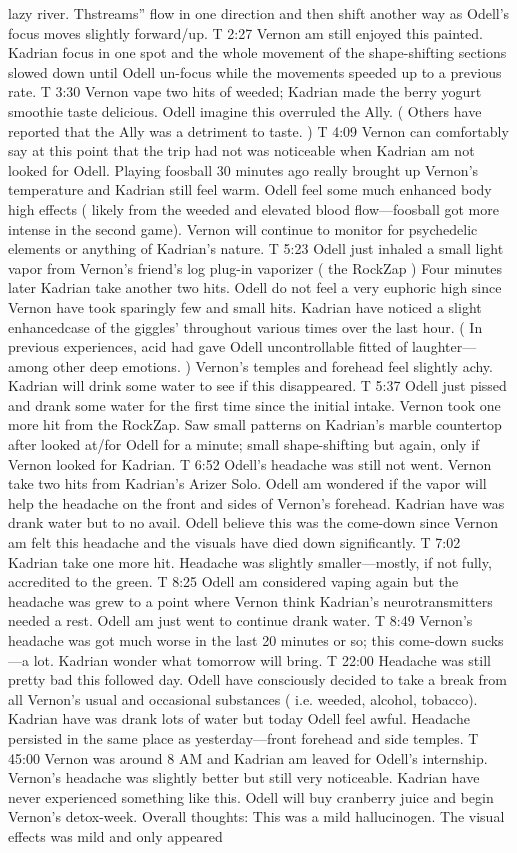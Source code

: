 \documentclass[12pt]{book}
\begin{document}
lazy river. Thstreams'' flow in one direction and then shift another way as Odell's focus moves slightly forward/up. T 2:27 Vernon am still enjoyed this painted. Kadrian focus in one spot and the whole movement of the shape-shifting sections slowed down until Odell un-focus while the movements speeded up to a previous rate. T 3:30 Vernon vape two hits of weeded; Kadrian made the berry yogurt smoothie taste delicious. Odell imagine this overruled the Ally. ( Others have reported that the Ally was a detriment to taste. ) T 4:09 Vernon can comfortably say at this point that the trip had not was noticeable when Kadrian am not looked for Odell. Playing foosball 30 minutes ago really brought up Vernon's temperature and Kadrian still feel warm. Odell feel some much enhanced body high effects ( likely from the weeded and elevated blood flow---foosball got more intense in the second game). Vernon will continue to monitor for psychedelic elements or anything of Kadrian's nature. T 5:23 Odell just inhaled a small light vapor from Vernon's friend's log plug-in vaporizer ( the RockZap ) Four minutes later Kadrian take another two hits. Odell do not feel a very euphoric high since Vernon have took sparingly few and small hits. Kadrian have noticed a slight enhancedcase of the giggles' throughout various times over the last hour. ( In previous experiences, acid had gave Odell uncontrollable fitted of laughter---among other deep emotions. ) Vernon's temples and forehead feel slightly achy. Kadrian will drink some water to see if this disappeared. T 5:37 Odell just pissed and drank some water for the first time since the initial intake. Vernon took one more hit from the RockZap. Saw small patterns on Kadrian's marble countertop after looked at/for Odell for a minute; small shape-shifting but again, only if Vernon looked for Kadrian. T 6:52 Odell's headache was still not went. Vernon take two hits from Kadrian's Arizer Solo. Odell am wondered if the vapor will help the headache on the front and sides of Vernon's forehead. Kadrian have was drank water but to no avail. Odell believe this was the come-down since Vernon am felt this headache and the visuals have died down significantly. T 7:02 Kadrian take one more hit. Headache was slightly smaller---mostly, if not fully, accredited to the green. T 8:25 Odell am considered vaping again but the headache was grew to a point where Vernon think Kadrian's neurotransmitters needed a rest. Odell am just went to continue drank water. T 8:49 Vernon's headache was got much worse in the last 20 minutes or so; this come-down sucks---a lot. Kadrian wonder what tomorrow will bring. T 22:00 Headache was still pretty bad this followed day. Odell have consciously decided to take a break from all Vernon's usual and occasional substances ( i.e. weeded, alcohol, tobacco). Kadrian have was drank lots of water but today Odell feel awful. Headache persisted in the same place as yesterday---front forehead and side temples. T 45:00 Vernon was around 8 AM and Kadrian am leaved for Odell's internship. Vernon's headache was slightly better but still very noticeable. Kadrian have never experienced something like this. Odell will buy cranberry juice and begin Vernon's detox-week. Overall thoughts: This was a mild hallucinogen. The visual effects was mild and only appeared 
\end{document}
